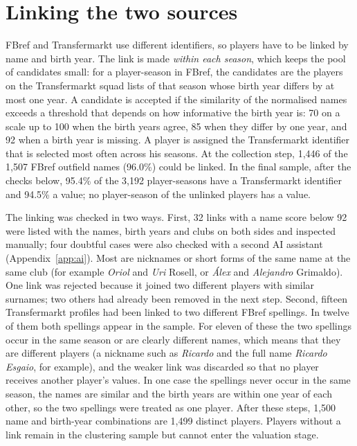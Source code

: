 \section{Linking the two sources}
\label{sec:data-linking}

FBref and Transfermarkt use different identifiers, so players have to be linked by name and birth year. The link is made \emph{within each season}, which keeps the pool of candidates small: for a player-season in FBref, the candidates are the players on the Transfermarkt squad lists of that season whose birth year differs by at most one year. A candidate is accepted if the similarity of the normalised names exceeds a threshold that depends on how informative the birth year is: 70 on a scale up to 100 when the birth years agree, 85 when they differ by one year, and 92 when a birth year is missing. A player is assigned the Transfermarkt identifier that is selected most often across his seasons. At the collection step, 1,446 of the 1,507 FBref outfield names (96.0\%) could be linked. In the final sample, after the checks below, 95.4\% of the 3,192 player-seasons have a Transfermarkt identifier and 94.5\% a value; no player-season of the unlinked players has a value.

The linking was checked in two ways. First, 32 links with a name score below 92 were listed with the names, birth years and clubs on both sides and inspected manually; four doubtful cases were also checked with a second AI assistant (Appendix~\ref{app:ai}). Most are nicknames or short forms of the same name at the same club (for example \emph{Oriol} and \emph{Uri} Rosell, or \emph{Álex} and \emph{Alejandro} Grimaldo). One link was rejected because it joined two different players with similar surnames; two others had already been removed in the next step. Second, fifteen Transfermarkt profiles had been linked to two different FBref spellings. In twelve of them both spellings appear in the sample. For eleven of these the two spellings occur in the same season or are clearly different names, which means that they are different players (a nickname such as \emph{Ricardo} and the full name \emph{Ricardo Esgaio}, for example), and the weaker link was discarded so that no player receives another player's values. In one case the spellings never occur in the same season, the names are similar and the birth years are within one year of each other, so the two spellings were treated as one player. After these steps, 1,500 name and birth-year combinations are 1,499 distinct players. Players without a link remain in the clustering sample but cannot enter the valuation stage.

